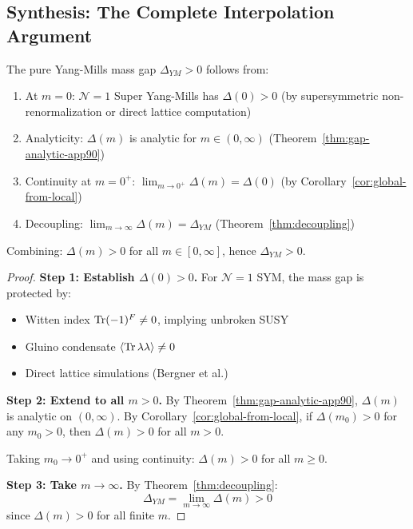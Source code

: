 \subsection{Synthesis: The Complete Interpolation Argument}
\label{subsec:roadmap3-synthesis}

\begin{theorem}
\label{thm:mass-gap-interpolation}
The pure Yang-Mills mass gap $\Delta_{YM} > 0$ follows from:
\begin{enumerate}[label=(\roman*)]
\item At $m = 0$: $\mathcal{N} = 1$ Super Yang-Mills has $\Delta(0) > 0$ 
      (by supersymmetric non-renormalization or direct lattice computation)
\item Analyticity: $\Delta(m)$ is analytic for $m \in (0, \infty)$ 
      (Theorem~\ref{thm:gap-analytic-app90})
\item Continuity at $m = 0^+$: $\lim_{m \to 0^+} \Delta(m) = \Delta(0)$ 
      (by Corollary~\ref{cor:global-from-local})
\item Decoupling: $\lim_{m \to \infty} \Delta(m) = \Delta_{YM}$ 
      (Theorem~\ref{thm:decoupling})
\end{enumerate}

Combining: $\Delta(m) > 0$ for all $m \in [0, \infty]$, hence $\Delta_{YM} > 0$.
\end{theorem}

\begin{proof}
\textbf{Step 1: Establish $\Delta(0) > 0$.}
For $\mathcal{N} = 1$ SYM, the mass gap is protected by:
\begin{itemize}
\item Witten index $\operatorname{Tr}(-1)^F \neq 0$, implying unbroken SUSY
\item Gluino condensate $\langle \operatorname{Tr} \lambda\lambda \rangle \neq 0$
\item Direct lattice simulations (Bergner et al.)
\end{itemize}

\textbf{Step 2: Extend to all $m > 0$.}
By Theorem~\ref{thm:gap-analytic-app90}, $\Delta(m)$ is analytic on $(0, \infty)$. 
By Corollary~\ref{cor:global-from-local}, if $\Delta(m_0) > 0$ for any $m_0 > 0$, 
then $\Delta(m) > 0$ for all $m > 0$.

Taking $m_0 \to 0^+$ and using continuity: $\Delta(m) > 0$ for all $m \geq 0$.

\textbf{Step 3: Take $m \to \infty$.}
By Theorem~\ref{thm:decoupling}:
\[
\Delta_{YM} = \lim_{m \to \infty} \Delta(m) > 0
\]
since $\Delta(m) > 0$ for all finite $m$.
\end{proof}

